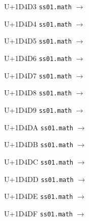 \documentclass{article}
\begin{document}
\begin{substitutions}
\goodbreak

U+1D4D3  \linebreak
    \texttt{ss01.math} $\to$  

\goodbreak

U+1D4D4  \linebreak
    \texttt{ss01.math} $\to$  

\goodbreak

U+1D4D5  \linebreak
    \texttt{ss01.math} $\to$  

\goodbreak

U+1D4D6  \linebreak
    \texttt{ss01.math} $\to$  

\goodbreak

U+1D4D7  \linebreak
    \texttt{ss01.math} $\to$  

\goodbreak

U+1D4D8  \linebreak
    \texttt{ss01.math} $\to$  

\goodbreak

U+1D4D9  \linebreak
    \texttt{ss01.math} $\to$  

\goodbreak

U+1D4DA  \linebreak
    \texttt{ss01.math} $\to$  

\goodbreak

U+1D4DB  \linebreak
    \texttt{ss01.math} $\to$  

\goodbreak

U+1D4DC  \linebreak
    \texttt{ss01.math} $\to$  

\goodbreak

U+1D4DD  \linebreak
    \texttt{ss01.math} $\to$  

\goodbreak

U+1D4DE  \linebreak
    \texttt{ss01.math} $\to$  

\goodbreak

U+1D4DF  \linebreak
    \texttt{ss01.math} $\to$  


\end{substitutions}
\end{document}
